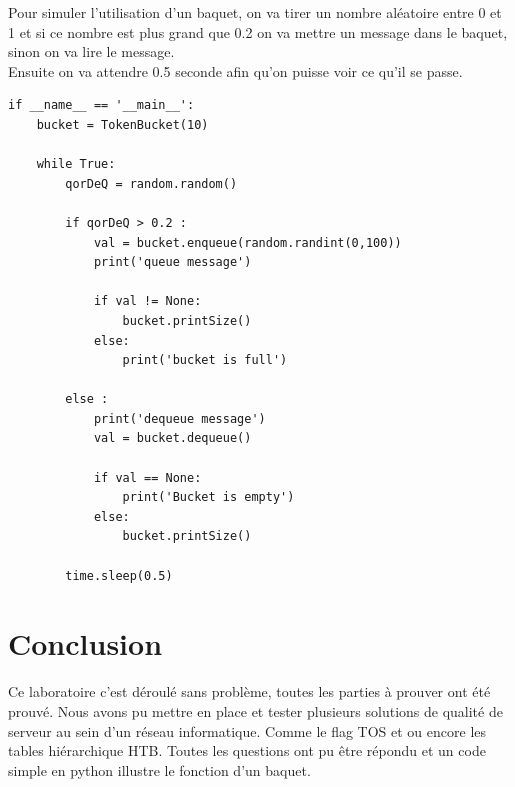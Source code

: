\documentclass{article}
\begin{document}
Pour simuler l'utilisation d'un baquet, on va tirer un nombre aléatoire entre 0 et 1 et si ce nombre est plus grand que 0.2 on va mettre un message dans le baquet, sinon on va lire le message.\\

Ensuite on va attendre 0.5 seconde afin qu'on puisse voir ce qu'il se passe.

\begin{lstlisting}
if __name__ == '__main__':
	bucket = TokenBucket(10)
	
	while True:
		qorDeQ = random.random()
		
		if qorDeQ > 0.2 :
			val = bucket.enqueue(random.randint(0,100))
			print('queue message')
			
			if val != None:
				bucket.printSize()
			else:
				print('bucket is full')
		
		else :
			print('dequeue message')
			val = bucket.dequeue()
		
			if val == None:
				print('Bucket is empty')
			else:
				bucket.printSize()
	
		time.sleep(0.5)
\end{lstlisting}

\section{Conclusion}

Ce laboratoire c'est déroulé sans problème, toutes les parties à prouver ont été prouvé. Nous avons pu mettre en place et tester plusieurs solutions de qualité de serveur au sein d'un réseau informatique. Comme le flag TOS et ou encore les tables hiérarchique HTB. Toutes les questions ont pu être répondu et un code simple en python illustre le fonction d'un baquet.
\end{document}
